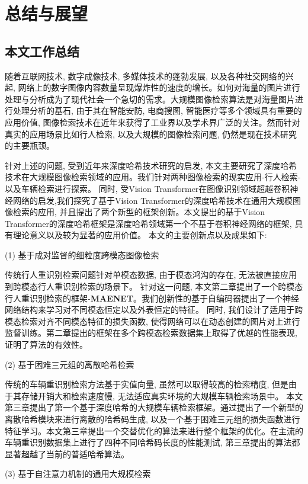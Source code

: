 \chapter{总结与展望}
\section{本文工作总结}
随着互联网技术, 数字成像技术, 多媒体技术的蓬勃发展, 以及各种社交网络的兴起, 网络上的数字图像内容数量呈现爆炸性的速度的增长。如何对海量的图片进行处理与分析成为了现代社会一个急切的需求。大规模图像检索算法是对海量图片进行处理分析的基石, 由于其在智能安防, 电商搜图, 智能医疗等多个领域具有重要的应用价值, 图像检索技术在近年来获得了工业界以及学术界广泛的关注。然而针对真实的应用场景比如行人检索, 以及大规模的图像检索问题, 仍然是现在技术研究的主要瓶颈。 \par
针对上述的问题, 受到近年来深度哈希技术研究的启发, 本文主要研究了深度哈希技术在大规模图像检索领域的应用。我们针对两种图像检索的现实应用-行人检索-以及车辆检索进行探索。 同时, 受Vision Transformer在图像识别领域超越卷积神经网络的启发,我们探究了基于Vision Transformer的深度哈希技术在通用大规模图像检索的应用, 并且提出了两个新型的框架创新。本文提出的基于Vision Transformer的深度哈希框架是深度哈希领域第一个不基于卷积神经网络的框架, 具有理论意义以及较为显著的应用价值。 本文的主要创新点以及成果如下:\par
(1) 基于成对监督的细粒度跨模态图像检索 \par
传统行人重识别检索问题针对单模态数据, 由于模态鸿沟的存在, 无法被直接应用到跨模态行人重识别检索的场景下。 针对这一问题, 本文第二章提出了一个跨模态行人重识别检索的框架-\textbf{MAENET}。我们创新性的基于自编码器提出了一个神经网络结构来学习对不同模态恒定以及外表恒定的特征。 同时, 我们设计了适用于跨模态检索对齐不同模态特征的损失函数, 使得网络可以在动态创建的图片对上进行监督训练。第二章提出的框架在多个跨模态检索数据集上取得了优越的性能表现, 证明了算法的有效性。\par 
(2) 基于困难三元组的离散哈希检索 \par
传统的车辆重识别检索方法基于实值向量, 虽然可以取得较高的检索精度, 但是由于其存储开销大和检索速度慢, 无法适应真实环境的大规模车辆检索场景中。 本文第三章提出了第一个基于深度哈希的大规模车辆检索框架。通过提出了一个新型的离散哈希模块来进行离散的哈希码生成, 以及一个基于困难三元组的损失函数进行特征学习。本文第三章提出一个交替优化的算法来进行整个框架的优化。在主流的车辆重识别数据集上进行了四种不同哈希码长度的性能测试, 第三章提出的算法都显著超越了当前的普适哈希算法。 \par
(3) 基于自注意力机制的通用大规模检索 \par
